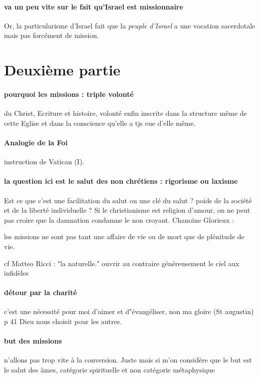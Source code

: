 \paragraph{va un peu vite sur le fait qu'Israel est missionnaire} Or, la particularisme d'Israel fait que la \textit{peuple d'Israel} a une vocation sacerdotale mais pas forcément de mission. 


\section{Deuxième partie}



\paragraph{pourquoi les missions : triple volonté} du Christ, Ecriture et histoire, volonté enfin inscrite dans la structure même de cette Eglise et dans la conscience qu'elle a tjs eue d'elle même.

\paragraph{Analogie de la Foi} instruction de Vatican (I). 


\paragraph{la question ici est le salut des non chrétiens : rigorisme ou laxisme} Est ce que c'est une facilitation du salut ou une clé du salut ? poids de la société et de la liberté individuelle ? Si le christianisme est religion d'amour, on ne peut pas croire que la damnation condamne le non croyant.
Chanoine Glorieux :
\begin{singlequote}
    les missions ne sont pas tant une affaire de vie ou de mort que de plénitude de vie.
\end{singlequote}
cf Matteo Ricci : "la naturelle."  ouvrir au contraire généreusement le ciel aux infidèles

\paragraph{détour par la charité} c'est une nécessité pour moi d'aimer et d"évangéliser, non ma gloire (St augustin) p 41
Dieu nous choisit pour les autres.


\paragraph{but des missions} n'allons pas trop vite à la conversion. Juste mais si m'on considère que le but est le salut des âmes, catégorie spirituelle et non catégorie métaphysique 


